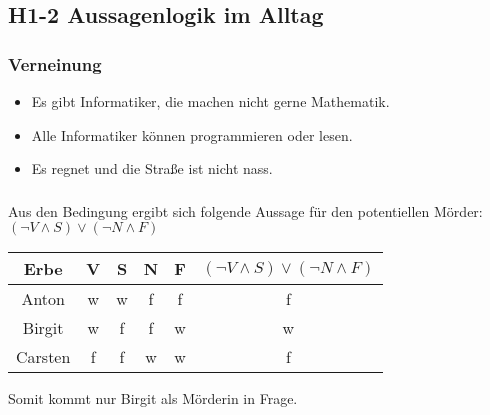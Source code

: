 \documentclass{article}
\begin{document}
\subsection{H1-2 Aussagenlogik im Alltag}
\subsubsection{Verneinung}

\begin{itemize}
  \item Es gibt Informatiker, die machen nicht gerne Mathematik.
  \item Alle Informatiker können programmieren oder lesen.
  \item Es regnet und die Straße ist nicht nass.
\end{itemize}

\subsubsection{}
Aus den Bedingung ergibt sich folgende Aussage für den potentiellen Mörder:
\((\neg V \land S) \lor (\neg N \land F)\)

\begin{center}
\begin{tabular}{|c || c c c c | c |}
  Erbe & V & S & N & F & \( (\neg V \land S) \lor (\neg N \land F) \) \\
  \hline
  Anton & w & w & f & f & f\\
  Birgit & w & f & f & w & w\\
  Carsten & f & f & w & w & f \\
\end{tabular}
\end{center}

Somit kommt nur Birgit als Mörderin in Frage.
\end{document}
